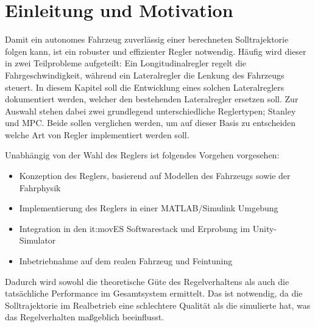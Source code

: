\section{Einleitung und Motivation}
Damit ein autonomes Fahrzeug zuverlässig einer berechneten Solltrajektorie folgen kann, ist ein robuster und effizienter Regler notwendig.
Häufig wird dieser in zwei Teilprobleme aufgeteilt: Ein Longitudinalregler regelt die Fahrgeschwindigkeit, während ein Lateralregler die Lenkung des Fahrzeugs steuert. 
In diesem Kapitel soll die Entwicklung eines solchen Lateralreglers dokumentiert werden, welcher den bestehenden Lateralregler ersetzen soll.
Zur Auswahl stehen dabei zwei grundlegend unterschiedliche Reglertypen; Stanley und \acs{MPC}. 
Beide sollen verglichen werden, um auf dieser Basis zu entscheiden welche Art von Regler implementiert werden soll.

Unabhängig von der Wahl des Reglers ist folgendes Vorgehen vorgesehen: 
\begin{itemize}
    \item Konzeption des Reglers, basierend auf Modellen des Fahrzeugs sowie der Fahrphysik
    \item Implementierung des Reglers in einer MATLAB/Simulink Umgebung
    \item Integration in den it:movES Softwarestack und Erprobung im Unity-Simulator
    \item Inbetriebnahme auf dem realen Fahrzeug und Feintuning
\end{itemize}

Dadurch wird sowohl die theoretische Güte des Regelverhaltens als auch die tatsächliche Performance im Gesamtsystem ermittelt.
Das ist notwendig, da die Solltrajektorie im Realbetrieb eine schlechtere Qualität als die simulierte hat, was das Regelverhalten maßgeblich beeinflusst.
